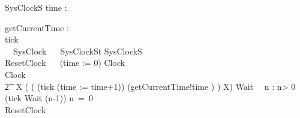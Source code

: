 \documentclass{llncs}
\begin{document}
\begin{schema}{SysClockS}
 time : \nat
\end{schema}
\begin{circus}%
\circchannel getCurrentTime : \nat\\
\circchannel tick\\
  \circprocess\ ~SysClock ~\circdef~\circbegin
  \circstate SysClockSt  SysClockS\\
  ResetClock ~\circdef~ (time := 0) \circseq Clock\\
  Clock ~\circdef~
  \\\t2  \circmu~X \circspot 
    (
      (
        (tick \then (time := time+1)) 
        \interleave 
        (getCurrentTime!time \then \Skip)
        )
      \circseq X)
  Wait~\circdef~ \circvar n : \nat \circspot
   \circif n> 0 \circthen (tick \then Wait (n-1))
   \circelse n~=~0 \circthen \Skip
   \circfi\\
  \circspot ResetClock
  \circend
\end{circus}
\end{document}
